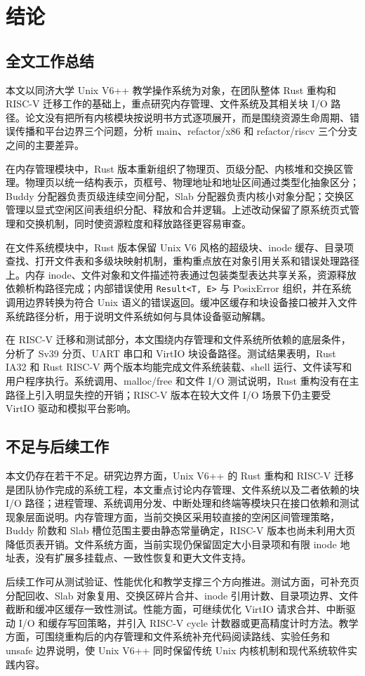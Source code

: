 \chapter{结论}

\section{全文工作总结}

本文以同济大学 Unix V6++ 教学操作系统为对象，在团队整体 Rust 重构和 RISC-V 迁移工作的基础上，重点研究内存管理、文件系统及其相关块 I/O 路径。论文没有把所有内核模块按说明书方式逐项展开，而是围绕资源生命周期、错误传播和平台边界三个问题，分析 main、refactor/x86 和 refactor/riscv 三个分支之间的主要差异。

在内存管理模块中，Rust 版本重新组织了物理页、页级分配、内核堆和交换区管理。物理页以统一结构表示，页框号、物理地址和地址区间通过类型化抽象区分；Buddy 分配器负责页级连续空间分配，Slab 分配器负责内核小对象分配；交换区管理以显式空闲区间表组织分配、释放和合并逻辑。上述改动保留了原系统页式管理和交换机制，同时使资源粒度和释放路径更容易审查。

在文件系统模块中，Rust 版本保留 Unix V6 风格的超级块、inode 缓存、目录项查找、打开文件表和多级块映射机制，重构重点放在对象引用关系和错误处理路径上。内存 inode、文件对象和文件描述符表通过包装类型表达共享关系，资源释放依赖析构路径完成；内部错误使用 \texttt{Result<T, E>} 与 PosixError 组织，并在系统调用边界转换为符合 Unix 语义的错误返回。缓冲区缓存和块设备接口被并入文件系统路径分析，用于说明文件系统如何与具体设备驱动解耦。

在 RISC-V 迁移和测试部分，本文围绕内存管理和文件系统所依赖的底层条件，分析了 Sv39 分页、UART 串口和 VirtIO 块设备路径。测试结果表明，Rust IA32 和 Rust RISC-V 两个版本均能完成文件系统装载、shell 运行、文件读写和用户程序执行。系统调用、malloc/free 和文件 I/O 测试说明，Rust 重构没有在主路径上引入明显失控的开销；RISC-V 版本在较大文件 I/O 场景下仍主要受 VirtIO 驱动和模拟平台影响。

\section{不足与后续工作}

本文仍存在若干不足。研究边界方面，Unix V6++ 的 Rust 重构和 RISC-V 迁移是团队协作完成的系统工程，本文重点讨论内存管理、文件系统以及二者依赖的块 I/O 路径；进程管理、系统调用分发、中断处理和终端等模块只在接口依赖和测试现象层面说明。内存管理方面，当前交换区采用较直接的空闲区间管理策略，Buddy 阶数和 Slab 槽位范围主要由静态常量确定，RISC-V 版本也尚未利用大页降低页表开销。文件系统方面，当前实现仍保留固定大小目录项和有限 inode 地址表，没有扩展多挂载点、一致性恢复和更大文件支持。

后续工作可从测试验证、性能优化和教学支撑三个方向推进。测试方面，可补充页分配回收、Slab 对象复用、交换区碎片合并、inode 引用计数、目录项边界、文件截断和缓冲区缓存一致性测试。性能方面，可继续优化 VirtIO 请求合并、中断驱动 I/O 和缓存写回策略，并引入 RISC-V cycle 计数器或更高精度计时方法。教学方面，可围绕重构后的内存管理和文件系统补充代码阅读路线、实验任务和 unsafe 边界说明，使 Unix V6++ 同时保留传统 Unix 内核机制和现代系统软件实践内容。
